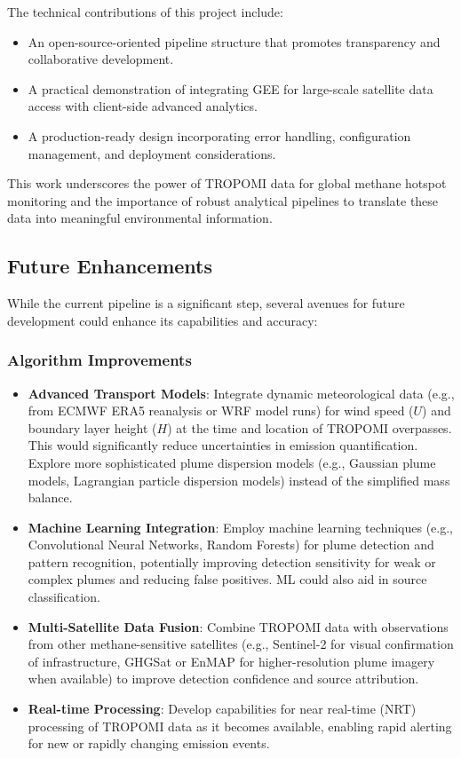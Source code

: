 \documentclass[12pt,a4paper]{article}
\begin{document}
The technical contributions of this project include:
\begin{itemize}
    \item An open-source-oriented pipeline structure that promotes transparency and collaborative development.
    \item A practical demonstration of integrating GEE for large-scale satellite data access with client-side advanced analytics.
    \item A production-ready design incorporating error handling, configuration management, and deployment considerations.
\end{itemize}
This work underscores the power of TROPOMI data for global methane hotspot monitoring and the importance of robust analytical pipelines to translate these data into meaningful environmental information.

\subsection{Future Enhancements}
While the current pipeline is a significant step, several avenues for future development could enhance its capabilities and accuracy:

\subsubsection{Algorithm Improvements}
\begin{itemize}
    \item \textbf{Advanced Transport Models}: Integrate dynamic meteorological data (e.g., from ECMWF ERA5 reanalysis or WRF model runs) for wind speed ($U$) and boundary layer height ($H$) at the time and location of TROPOMI overpasses. This would significantly reduce uncertainties in emission quantification. Explore more sophisticated plume dispersion models (e.g., Gaussian plume models, Lagrangian particle dispersion models) instead of the simplified mass balance.
    \item \textbf{Machine Learning Integration}: Employ machine learning techniques (e.g., Convolutional Neural Networks, Random Forests) for plume detection and pattern recognition, potentially improving detection sensitivity for weak or complex plumes and reducing false positives. ML could also aid in source classification.
    \item \textbf{Multi-Satellite Data Fusion}: Combine TROPOMI data with observations from other methane-sensitive satellites (e.g., Sentinel-2 for visual confirmation of infrastructure, GHGSat or EnMAP for higher-resolution plume imagery when available) to improve detection confidence and source attribution.
    \item \textbf{Real-time Processing}: Develop capabilities for near real-time (NRT) processing of TROPOMI data as it becomes available, enabling rapid alerting for new or rapidly changing emission events.
\end{itemize}
\end{document}

